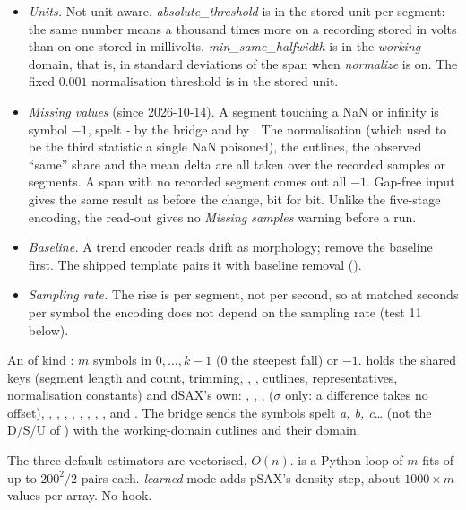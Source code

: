\begin{itemize}
\item \emph{Units.} Not unit-aware. \emph{absolute\_threshold} is in the stored unit per
  segment: the same number means a thousand times more on a recording stored in volts than
  on one stored in millivolts. \emph{min\_same\_halfwidth} is in the \emph{working} domain,
  that is, in standard deviations of the span when \emph{normalize} is on. The fixed
  $0.001$ normalisation threshold is in the stored unit.
\item \emph{Missing values} (since 2026-10-14). A segment touching a NaN or infinity is
  symbol $-1$, spelt \emph{-} by the bridge and by . The
  normalisation (which used to be the third statistic a single NaN poisoned), the cutlines,
  the observed ``same'' share and the mean delta are all taken over the recorded samples or
  segments. A span with no recorded segment comes out all $-1$. Gap-free input gives the
  same result as before the change, bit for bit. Unlike the five-stage encoding, the
  read-out gives no \emph{Missing samples} warning before a run.
\item \emph{Baseline.} A trend encoder reads drift as morphology; remove the baseline
  first. The shipped template pairs it with baseline removal
  ().
\item \emph{Sampling rate.} The rise is per segment, not per second, so at matched seconds
  per symbol the encoding does not depend on the sampling rate (test 11 below).
\end{itemize}

An  of kind : $m$ symbols in $0,\dots,k-1$ (0 the steepest
fall) or $-1$.  holds the shared keys (segment length and count,
trimming, , , cutlines, representatives, normalisation constants)
and dSAX's own:  , , ,
 ($\sigma$ only: a difference takes no offset), ,
, , , ,
, , ,
 and . The bridge sends the
symbols spelt \emph{a, b, c}\ldots{} (not the D/S/U of ) with the
working-domain cutlines and their domain.

The three default estimators are vectorised, $O(n)$.  is a Python loop of
$m$ fits of up to $200^2/2$ pairs each. \emph{learned} mode adds pSAX's density step, about
$1000\times m$ values per array. No  hook.

